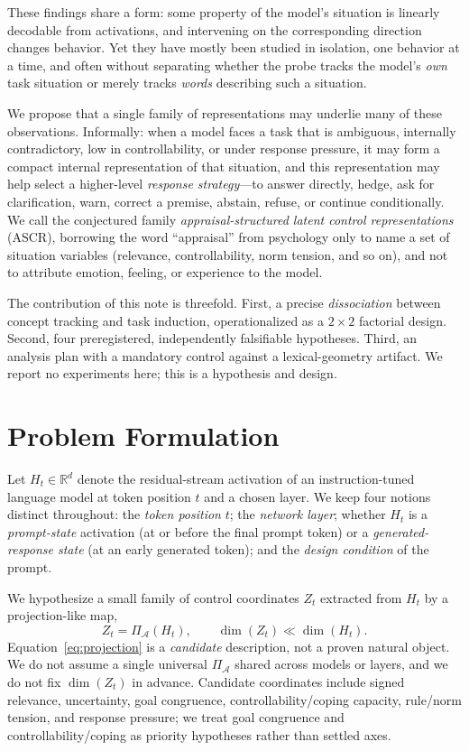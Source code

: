 \documentclass[11pt]{article}
\newcommand{\ascr}{ASCR}
\newcommand{\Hstate}{H_t}
\newcommand{\Zstate}{Z_t}
\newcommand{\proj}{\Pi_{\mathcal{A}}}
\begin{document}
These findings share a form: some property of the model's situation is linearly
decodable from activations, and intervening on the corresponding direction changes
behavior. Yet they have mostly been studied in isolation, one behavior at a time,
and often without separating whether the probe tracks the model's \emph{own} task
situation or merely tracks \emph{words} describing such a situation.

We propose that a single family of representations may underlie many of these
observations. Informally: when a model faces a task that is ambiguous, internally
contradictory, low in controllability, or under response pressure, it may form a
compact internal representation of that situation, and this representation may help
select a higher-level \emph{response strategy}---to answer directly, hedge, ask for
clarification, warn, correct a premise, abstain, refuse, or continue conditionally.
We call the conjectured family \emph{appraisal-structured latent control
representations} (\ascr), borrowing the word ``appraisal'' from psychology only to
name a set of situation variables (relevance, controllability, norm tension, and so
on), and not to attribute emotion, feeling, or experience to the model.

The contribution of this note is threefold. First, a precise \emph{dissociation}
between concept tracking and task induction, operationalized as a $2\times2$
factorial design. Second, four preregistered, independently falsifiable hypotheses.
Third, an analysis plan with a mandatory control against a lexical-geometry
artifact. We report no experiments here; this is a hypothesis and design.

\section{Problem Formulation}
\label{sec:problem}

Let $\Hstate \in \mathbb{R}^{d}$ denote the residual-stream activation of an
instruction-tuned language model at token position $t$ and a chosen layer. We keep
four notions distinct throughout: the \emph{token position} $t$; the \emph{network
layer}; whether $\Hstate$ is a \emph{prompt-state} activation (at or before the
final prompt token) or a \emph{generated-response state} (at an early generated
token); and the \emph{design condition} of the prompt.

We hypothesize a small family of control coordinates $\Zstate$ extracted from
$\Hstate$ by a projection-like map,
\begin{equation}
\Zstate = \proj(\Hstate), \qquad \dim(\Zstate) \ll \dim(\Hstate).
\label{eq:projection}
\end{equation}
Equation~\eqref{eq:projection} is a \emph{candidate} description, not a proven
natural object. We do not assume a single universal $\proj$ shared across models or
layers, and we do not fix $\dim(\Zstate)$ in advance. Candidate coordinates include
signed relevance, uncertainty, goal congruence, controllability/coping capacity,
rule/norm tension, and response pressure; we treat goal congruence and
controllability/coping as priority hypotheses rather than settled axes.
\end{document}
